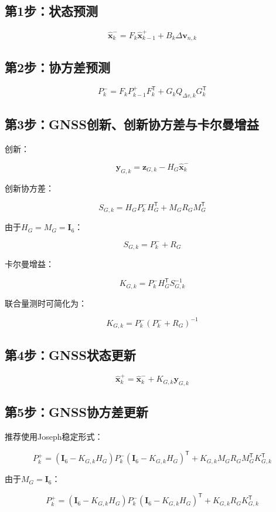 \documentclass[12pt,a4paper]{ctexart}
\newcommand{\I}{\mathbf I}
\newcommand{\xhat}{\hat{\mathbf x}}
\newcommand{\transpose}{^{\mathsf T}}
\begin{document}
\subsection*{第1步：状态预测}

\[
\boxed{
\xhat_k^- =
F_k\xhat_{k-1}^+
+
B_k\Delta\mathbf v_{n,k}
}
\]

\subsection*{第2步：协方差预测}

\[
\boxed{
P_k^- =
F_kP_{k-1}^+F_k\transpose
+
G_kQ_{\Delta v,k}G_k\transpose
}
\]

\subsection*{第3步：GNSS创新、创新协方差与卡尔曼增益}

创新：

\[
\boxed{
\mathbf y_{G,k}
=
\mathbf z_{G,k}
-
H_G\xhat_k^-
}
\]

创新协方差：

\[
\boxed{
S_{G,k}
=
H_GP_k^-H_G\transpose
+
M_GR_GM_G\transpose
}
\]

由于$H_G=M_G=\I_6$：

\[
\boxed{
S_{G,k}=P_k^-+R_G
}
\]

卡尔曼增益：

\[
\boxed{
K_{G,k}
=
P_k^-H_G\transpose S_{G,k}^{-1}
}
\]

联合量测时可简化为：

\[
\boxed{
K_{G,k}
=
P_k^-(P_k^-+R_G)^{-1}
}
\]

\subsection*{第4步：GNSS状态更新}

\[
\boxed{
\xhat_k^+
=
\xhat_k^-
+
K_{G,k}\mathbf y_{G,k}
}
\]

\subsection*{第5步：GNSS协方差更新}

推荐使用Joseph稳定形式：

\[
\boxed{
P_k^+
=
(\I_6-K_{G,k}H_G)
P_k^-
(\I_6-K_{G,k}H_G)\transpose
+
K_{G,k}M_GR_GM_G\transpose K_{G,k}\transpose
}
\]

由于$M_G=\I_6$：

\[
\boxed{
P_k^+
=
(\I_6-K_{G,k}H_G)
P_k^-
(\I_6-K_{G,k}H_G)\transpose
+
K_{G,k}R_GK_{G,k}\transpose
}
\]
\end{document}

